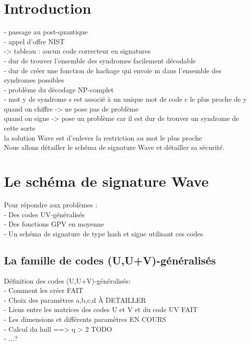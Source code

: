 \documentclass[12pt]{article}
\theoremstyle{definition}
\begin{document}
\section*{Introduction}

- passage au post-quantique \\
- appel d'offre NIST \\
	-> tableau : aucun code correcteur en signatures \\
- dur de trouver l'ensemble des syndromes facilement décodable \\
- dur de créer une fonction de hachage qui envoie m dans l'ensemble des syndromes possibles \\
- problème du décodage NP-complet \\
- mot y de syndrome s est associé à un unique mot de code c le plus proche de y \\
quand on chiffre -> ne pose pas de problème \\
quand on signe -> pose un problème car il est dur de trouver un syndrome de cette sorte \\
la solution Wave est d'enlever la restriction au mot le plus proche \\
Nous allons détailler le schéma de signature Wave et détailler sa sécurité. \\

\section{Le schéma de signature Wave}
Pour répondre aux problèmes : \\

- Des codes UV-généralisés \\
- Des fonctions GPV en moyenne \\
- Un schéma de signature de type hash et signe utilisant ces codes \\

\subsection{La famille de codes (U,U+V)-généralisés}
Définition des codes (U,U+V)-généralisés: \\
- Comment les créer  FAIT \\
- Choix des paramètres a,b,c,d \`A DETAILLER \\
- Liens entre les matrices des codes U et V et du code UV FAIT \\
- Les dimensions et différents paramètres  EN COURS \\
- Calcul du hull ==> q > 2 TODO \\
- ...? \\
\end{document}
